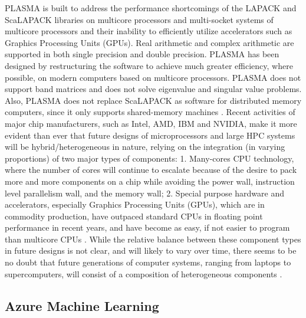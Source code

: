     PLASMA is built to address the performance shortcomings of the
    LAPACK and ScaLAPACK libraries on multicore processors and
    multi-socket systems of multicore processors and their inability
    to efficiently utilize accelerators such as Graphics Processing
    Units (GPUs). Real arithmetic and complex arithmetic are supported
    in both single precision and double precision.  PLASMA has been
    designed by restructuring the software to achieve much greater
    efficiency, where possible, on modern computers based on multicore
    processors. PLASMA does not support band matrices and does not
    solve eigenvalue and singular value problems. Also, PLASMA does
    not replace ScaLAPACK as software for distributed memory
    computers, since it only supports shared-memory
    machines \cite{paper-plasma-magma-1} \cite{www-plasma-1}. Recent
    activities of major chip manufacturers, such as Intel, AMD, IBM
    and NVIDIA, make it more evident than ever that future designs of
    microprocessors and large HPC systems will be hybrid/heterogeneous
    in nature, relying on the integration (in varying proportions) of
    two major types of components:
    1. Many-cores CPU technology, where the number of cores will
    continue to escalate because of the desire to pack more and more
    components on a chip while avoiding the power wall, instruction
    level parallelism wall, and the memory wall;
    2. Special purpose hardware and accelerators, especially Graphics
    Processing Units (GPUs), which are in commodity production, have
    outpaced standard CPUs in floating point performance in recent
    years, and have become as easy, if not easier to program than
    multicore CPUs \cite{paper-plasma-magma-2, paper-plasma-magma-3}.
    While the relative balance between these
    component types in future designs is not clear, and will likely to
    vary over time, there seems to be no doubt that future generations
    of computer systems, ranging from laptops to supercomputers, will
    consist of a composition of heterogeneous components
    \cite{paper-plasma-magma-4, paper-plasma-magma-5,paper-plasma-magma-6}.


\pv

\subsection{Azure Machine Learning}
    
